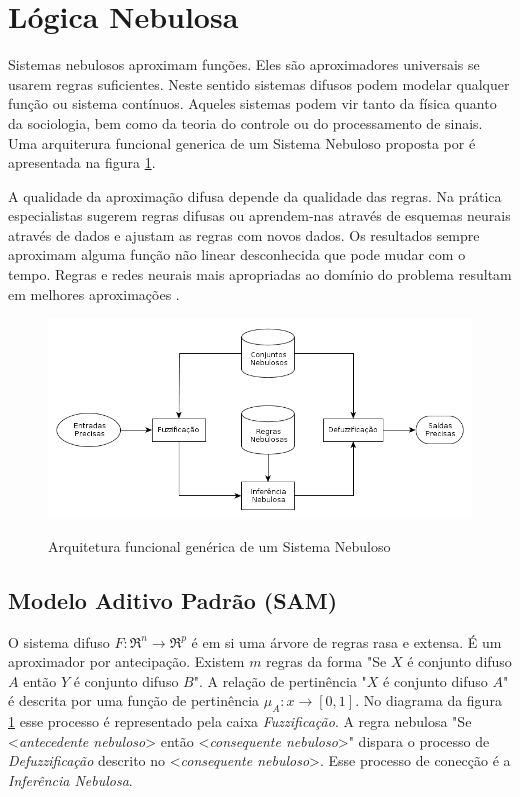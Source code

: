 \section{Lógica Nebulosa}

Sistemas nebulosos aproximam funções. Eles são aproximadores universais se usarem regras suficientes. 
Neste sentido sistemas difusos podem modelar qualquer função ou sistema contínuos. Aqueles sistemas 
podem vir tanto da física quanto da sociologia, bem como da teoria do controle ou do 
processamento de sinais. Uma arquiterura funcional generica de um Sistema Nebuloso proposta por
\cite{passos2005datamining} é apresentada na figura \ref{arq_fuzzy}.

A qualidade da aproximação difusa depende da qualidade das regras. Na prática especialistas sugerem regras
difusas ou aprendem-nas através de esquemas neurais através de dados e ajustam as regras com novos dados.
Os resultados sempre aproximam alguma função não linear desconhecida que pode mudar com o tempo. Regras e redes neurais mais apropriadas ao domínio do problema resultam em melhores aproximações \cite{kosko1997fuzzy}.

\begin{figure}
  \includegraphics[width=15cm]{imgs/arquitetura_fuzzy}\label{arq_fuzzy}
  \caption{Arquitetura funcional genérica de um Sistema Nebuloso \cite{passos2005datamining}}
\end{figure}

\subsection{Modelo Aditivo Padrão (SAM)}

O sistema difuso $F:\Re^n \rightarrow \Re^p$ é em si uma árvore de regras rasa e extensa. É um aproximador
por antecipação. Existem $m$ regras da forma "Se $X$ é conjunto difuso $A$ então $Y$ é conjunto difuso $B$".
A relação de pertinência "$X$ é conjunto difuso $A$" é descrita por uma função de pertinência
$\mu_A: x \longrightarrow [0,1]$. No diagrama da figura \ref{arq_fuzzy} esse processo é representado pela
caixa \emph{Fuzzificação}. A regra nebulosa "Se <\textit{antecedente nebuloso}> então <\textit{consequente nebuloso}>" dispara
o processo de \emph{Defuzzificação} descrito no <\textit{consequente nebuloso}>. Esse processo de conecção é a
\emph{Inferência Nebulosa}.

